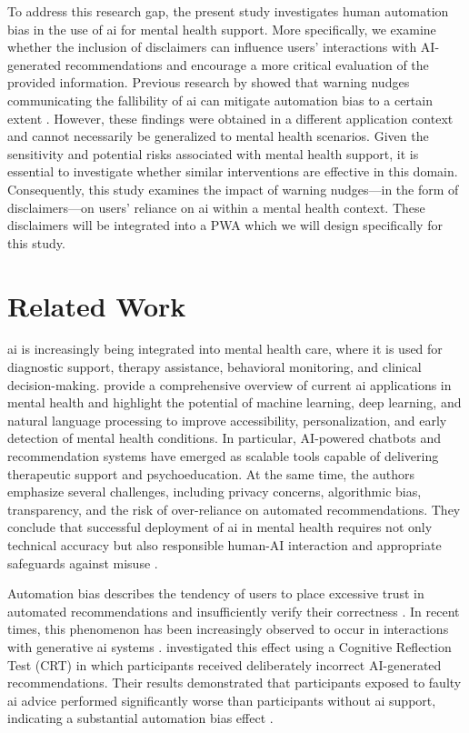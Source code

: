 \documentclass[sigconf,natbib=false]{acmart}
\begin{document}
To address this research gap, the present study investigates human automation bias in the use of \Gls{ai} for mental health support.
More specifically, we examine whether the inclusion of disclaimers can influence users’ interactions with AI-generated recommendations and encourage a more critical evaluation of the provided information.
Previous research by \citeauthor*[]{wingerter_mitigating_2025} showed that warning nudges communicating the fallibility of \Gls{ai} can mitigate automation bias to a certain extent \autocite[]{wingerter_mitigating_2025}.
However, these findings were obtained in a different application context and cannot necessarily be generalized to mental health scenarios.
Given the sensitivity and potential risks associated with mental health support, it is essential to investigate whether similar interventions are effective in this domain.
Consequently, this study examines the impact of warning nudges—in the form of disclaimers—on users’ reliance on \Gls{ai} within a mental health context. These disclaimers will be integrated into a PWA which we will design specifically for this study. 


\section{Related Work}
\Gls{ai} is increasingly being integrated into mental health care, where it is used for diagnostic support, therapy assistance, behavioral monitoring, and clinical decision-making.
\citeauthor[]{ali_artificial_2025} provide a comprehensive overview of current \Gls{ai} applications in mental health and highlight the potential of machine learning, deep learning, and natural language processing to improve accessibility, personalization, and early detection of mental health conditions.
In particular, AI-powered chatbots and recommendation systems have emerged as scalable tools capable of delivering therapeutic support and psychoeducation.
At the same time, the authors emphasize several challenges, including privacy concerns, algorithmic bias, transparency, and the risk of over-reliance on automated recommendations.
They conclude that successful deployment of \Gls{ai} in mental health requires not only technical accuracy but also responsible human-AI interaction and appropriate safeguards against misuse \autocite[]{ali_artificial_2025}.

Automation bias describes the tendency of users to place excessive trust in automated recommendations and insufficiently verify their correctness \autocite[p~391]{parasuraman_complacency_2010}.
In recent times, this phenomenon has been increasingly observed to occur in interactions with generative \Gls{ai} systems \autocite[]{kucking_automation_2026}.
\citeauthor[]{wingerter_mitigating_2025} investigated this effect using a Cognitive Reflection Test (CRT) in which participants received deliberately incorrect AI-generated recommendations.
Their results demonstrated that participants exposed to faulty \Gls{ai} advice performed significantly worse than participants without \Gls{ai} support, indicating a substantial automation bias effect \autocite[]{wingerter_mitigating_2025}.
\end{document}
